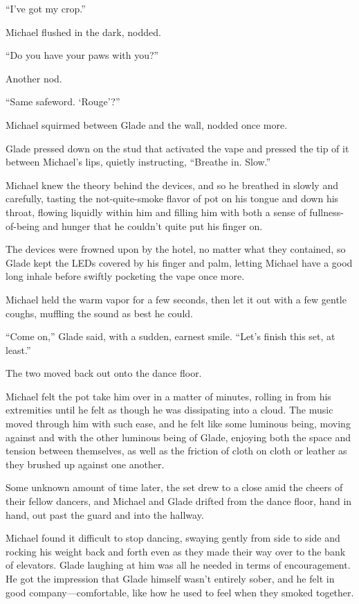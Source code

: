 ``I've got my crop.''

Michael flushed in the dark, nodded.

``Do you have your paws with you?''

Another nod.

``Same safeword. `Rouge'?''

Michael squirmed between Glade and the wall, nodded once more.

Glade pressed down on the stud that activated the vape and pressed the tip of it between Michael's lips, quietly instructing, ``Breathe in. Slow.''

Michael knew the theory behind the devices, and so he breathed in slowly and carefully, tasting the not-quite-smoke flavor of pot on his tongue and down his throat, flowing liquidly within him and filling him with both a sense of fullness-of-being and hunger that he couldn't quite put his finger on.

The devices were frowned upon by the hotel, no matter what they contained, so Glade kept the LEDs covered by his finger and palm, letting Michael have a good long inhale before swiftly pocketing the vape once more.

Michael held the warm vapor for a few seconds, then let it out with a few gentle coughs, muffling the sound as best he could.

``Come on,'' Glade said, with a sudden, earnest smile. ``Let's finish this set, at least.''

The two moved back out onto the dance floor.

Michael felt the pot take him over in a matter of minutes, rolling in from his extremities until he felt as though he was dissipating into a cloud. The music moved through him with such ease, and he felt like some luminous being, moving against and with the other luminous being of Glade, enjoying both the space and tension between themselves, as well as the friction of cloth on cloth or leather as they brushed up against one another.

Some unknown amount of time later, the set drew to a close amid the cheers of their fellow dancers, and Michael and Glade drifted from the dance floor, hand in hand, out past the guard and into the hallway.

Michael found it difficult to stop dancing, swaying gently from side to side and rocking his weight back and forth even as they made their way over to the bank of elevators. Glade laughing at him was all he needed in terms of encouragement. He got the impression that Glade himself wasn't entirely sober, and he felt in good company---comfortable, like how he used to feel when they smoked together.

